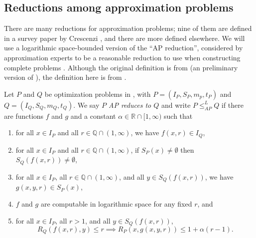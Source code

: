 \documentclass[]{article}
\newcommand{\APr}{\leq_{AP}^{L}}
\begin{document}
\subsection{Reductions among approximation problems}

There are many reductions for approximation problems; nine of them are defined in a survey paper by Crescenzi \cite{crescenzi97}, and there are more defined elsewhere.
We will use a logarithmic space-bounded version of the ``AP reduction'', considered by approximation experts to be a reasonable reduction to use when constructing complete problems \cite[Section~2]{crescenzi97} \cite[Section~8.6]{acgkmp99}.
Although the original definition is from \cite[Definition~9]{ckst95} (an preliminary version of \cite[Definition~2.5]{ckst99}), the definition here is from \cite[Definition~8.3]{acgkmp99}.

\begin{definition}{{\cite[Definition~8.3]{acgkmp99}}}
  Let $P$ and $Q$ be optimization problems in \NNCO, with $P = (I_P, S_P, m_p, t_P)$ and $Q = (I_Q, S_Q, m_Q, t_Q)$.
  We say \emph{$P$ AP reduces to $Q$} and write $P \APr Q$ if there are functions $f$ and $g$ and a constant $\alpha \in \mathbb{R} \cap [1, \infty)$ such that
  \begin{enumerate}
  \item for all $x \in I_P$ and all $r \in \mathbb{Q} \cap (1, \infty)$, we have $f(x, r) \in I_Q$,
  \item for all $x \in I_P$ and all $r \in \mathbb{Q} \cap (1, \infty)$, if $S_P(x) \neq \emptyset$ then $S_Q(f(x, r)) \neq \emptyset$,
  \item for all $x \in I_P$, all $r \in \mathbb{Q} \cap (1, \infty)$, and all $y \in S_Q(f(x, r))$, we have $g(x, y, r) \in S_P(x)$,
  \item $f$ and $g$ are computable in logarithmic space for any fixed $r$, and
  \item for all $x \in I_P$, all $r > 1$, and all $y\in S_Q(f(x, r))$,
    \begin{equation*}
      R_Q(f(x, r), y) \leq r \implies R_P(x, g(x, y, r)) \leq 1 + \alpha(r - 1).
    \end{equation*}
  \end{enumerate}
\end{definition}

\end{document}
